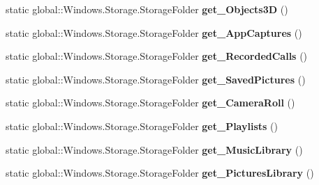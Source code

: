 \begin{DoxyCompactItemize}
\mbox{\label{class_windows_1_1_storage_1_1_known_folders_a7538b526a7c946e575ca80ffce8b9c64}} 
static global\+::\+Windows.\+Storage.\+Storage\+Folder {\bfseries get\+\_\+\+Objects3D} ()
\item 
\mbox{\label{class_windows_1_1_storage_1_1_known_folders_ab66696615f1c71c5ee62274cc6643a89}} 
static global\+::\+Windows.\+Storage.\+Storage\+Folder {\bfseries get\+\_\+\+App\+Captures} ()
\item 
\mbox{\label{class_windows_1_1_storage_1_1_known_folders_a02949a31d02148e80a3afd3aed34960d}} 
static global\+::\+Windows.\+Storage.\+Storage\+Folder {\bfseries get\+\_\+\+Recorded\+Calls} ()
\item 
\mbox{\label{class_windows_1_1_storage_1_1_known_folders_a4869671672489dd57931f6074817a15c}} 
static global\+::\+Windows.\+Storage.\+Storage\+Folder {\bfseries get\+\_\+\+Saved\+Pictures} ()
\item 
\mbox{\label{class_windows_1_1_storage_1_1_known_folders_a4e8edc457f8a28894740a09fc5dbe161}} 
static global\+::\+Windows.\+Storage.\+Storage\+Folder {\bfseries get\+\_\+\+Camera\+Roll} ()
\item 
\mbox{\label{class_windows_1_1_storage_1_1_known_folders_af660eb2549fc7f22379774000686d890}} 
static global\+::\+Windows.\+Storage.\+Storage\+Folder {\bfseries get\+\_\+\+Playlists} ()
\item 
\mbox{\label{class_windows_1_1_storage_1_1_known_folders_a385778d65001ff5821c5395815254772}} 
static global\+::\+Windows.\+Storage.\+Storage\+Folder {\bfseries get\+\_\+\+Music\+Library} ()
\item 
\mbox{\label{class_windows_1_1_storage_1_1_known_folders_a653b9b1f039c720de8b02e32d4139930}} 
static global\+::\+Windows.\+Storage.\+Storage\+Folder {\bfseries get\+\_\+\+Pictures\+Library} ()
\item 

\end{DoxyCompactItemize}
